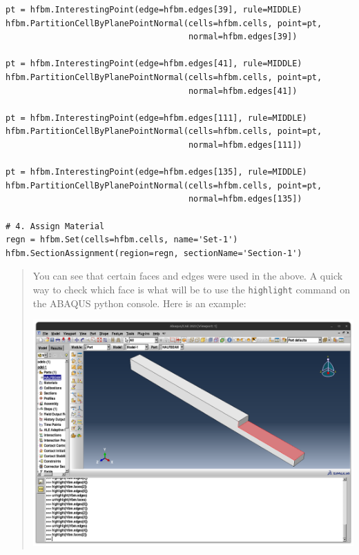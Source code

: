 \documentclass[11pt]{article}
\begin{document}
\begin{enumerate}
\begin{verbatim}
pt = hfbm.InterestingPoint(edge=hfbm.edges[39], rule=MIDDLE)
hfbm.PartitionCellByPlanePointNormal(cells=hfbm.cells, point=pt,
                                     normal=hfbm.edges[39])

pt = hfbm.InterestingPoint(edge=hfbm.edges[41], rule=MIDDLE)
hfbm.PartitionCellByPlanePointNormal(cells=hfbm.cells, point=pt,
                                     normal=hfbm.edges[41])

pt = hfbm.InterestingPoint(edge=hfbm.edges[111], rule=MIDDLE)
hfbm.PartitionCellByPlanePointNormal(cells=hfbm.cells, point=pt,
                                     normal=hfbm.edges[111])

pt = hfbm.InterestingPoint(edge=hfbm.edges[135], rule=MIDDLE)
hfbm.PartitionCellByPlanePointNormal(cells=hfbm.cells, point=pt,
                                     normal=hfbm.edges[135])

# 4. Assign Material
regn = hfbm.Set(cells=hfbm.cells, name='Set-1')
hfbm.SectionAssignment(region=regn, sectionName='Section-1')
\end{verbatim}
\end{enumerate}
\begin{quote}
                              \begin{tcolorbox}[colback=osbe-bg,colframe=osbe-fg,title={Scripting note},sharp corners,boxrule=0.4pt]
You can see that certain faces and edges were used in the above.
A quick way to check which face is what will be to use the \texttt{highlight} command on the ABAQUS python console.
Here is an example:
\begin{center}
\includegraphics[width=.9\linewidth]{./figs/highl.png}
\end{center}


               \end{tcolorbox}
\end{quote}
\end{document}
